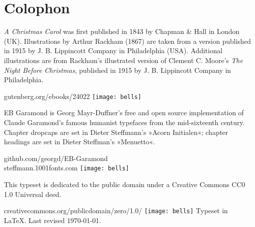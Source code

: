 \documentclass[
a5paper,
]{scrbook} %
\begin{document}
\chapter*{Colophon}
\vfill
\centering
\begin{minipage}{\textwidth}
\textit{A Christmas Carol} was first published in 1843 by Chapman \& Hall in London (UK). Illustrations by Arthur Rackham (1867) are taken from a version published in 1915 by J. B. Lippincott Company in Philadelphia (USA). Additional illustrations are from Rackham's illustrated version of Clement C. Moore's \textit{The Night Before Christmas}, published in 1915 by J. B. Lippincott Company in Philadelphia.
\end{minipage}
\vfill
gutenberg.org/ebooks/24022
\vfill
\texttt{[image: bells]}
\vfill
\begin{minipage}{\textwidth}
EB Garamond is Georg Mayr-Duffner's free and open source implementation of Claude Garamond’s famous humanist typefaces from the mid-sixteenth century. Chapter dropcaps are set in Dieter Steffmann's »Acorn Initialen«; chapter headings are set in Dieter Steffman's »Menuetto«.
\end{minipage}
\vfill
github.com/georgd/EB-Garamond
\\steffmann.1001fonts.com
\vfill
\texttt{[image: bells]}
\vfill
\begin{minipage}{\textwidth}
This typeset is dedicated to the public domain under a Creative Commons CC0 1.0 Universal deed.
\end{minipage}
\vfill
creativecommons.org/publicdomain/zero/1.0/
\vfill
\texttt{[image: bells]}
\vfill
Typeset in \LaTeX{}. Last revised \today.
\thispagestyle{empty}
\end{document}
